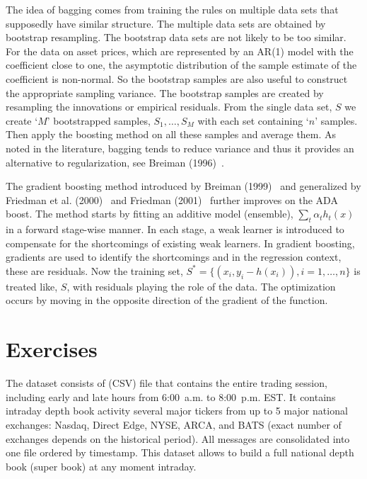 The idea of bagging comes from training the rules on multiple data sets that supposedly have similar structure. The multiple data sets are obtained by bootstrap  resampling. The bootstrap data sets are not likely to be too similar. For the data on asset prices, which are represented by an AR(1) model with the coefficient close to one, the asymptotic distribution of the sample estimate of the coefficient is non-normal. So the bootstrap samples are also useful to construct the appropriate sampling variance. The bootstrap samples are created by resampling the innovations or empirical residuals. From the single data set, $S$ we create `$M$' bootstrapped samples, $S_1, \ldots, S_M$ with each set containing `$n$' samples. Then apply the boosting method on all these samples and average them. As noted in the literature, bagging tends to reduce variance and thus it provides an alternative to regularization, see Breiman (1996)~\cite{breiman1996bagging}.


The gradient boosting method introduced by Breiman (1999)~\cite{breiman1999prediction} and generalized by Friedman et al. (2000)~\cite{friedman2000additive} and Friedman (2001)~\cite{friedman2001greedy} further improves on the ADA boost. The method starts by fitting an additive model (ensemble), $\sum_t \alpha_t h_t (x)$ in a forward stage-wise manner. In each stage, a weak learner is introduced to compensate for the shortcomings of existing weak learners. In gradient boosting, gradients are used to identify the shortcomings and in the regression context, these are residuals. Now the training set, $S^*=\{ (x_i, y_i-h(x_i)) , i =1,\ldots,n \}$ is treated like, $S$, with residuals playing the role of the data. The optimization occurs by moving in the opposite direction of the gradient of the function.



\section{Exercises}

The dataset consists of (CSV) file that contains the entire trading session, including early and late hours from 6:00~a.m. to 8:00~p.m. EST. It contains intraday depth book activity several major tickers from up to 5 major national exchanges: Nasdaq, Direct Edge, NYSE, ARCA, and BATS (exact number of exchanges depends on the historical period). All messages are consolidated into one file ordered by timestamp. This dataset allows to build a full national depth book (super book) at any moment intraday. 

